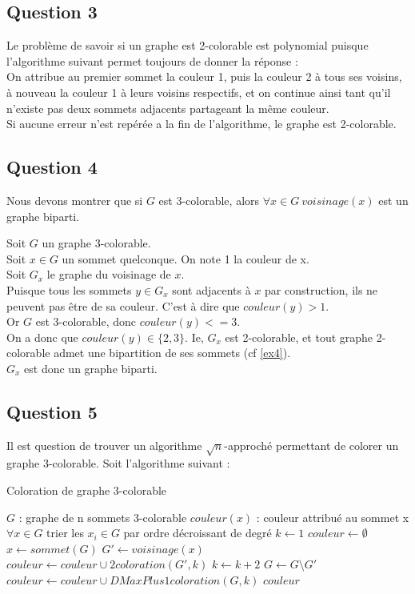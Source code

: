 \subsection{Question 3}\label{ex16_q3}
Le probl\`eme de savoir si un graphe est 2-colorable est polynomial puisque l'algorithme
suivant permet toujours de donner la r\'eponse :\\
On attribue au premier sommet la couleur 1, puis la couleur 2 \`a tous ses voisins, \`a
nouveau la couleur 1 \`a leurs voisins respectifs, et on continue ainsi tant qu'il
n'existe pas deux sommets adjacents partageant la m\^eme couleur.\\
Si aucune erreur n'est rep\'er\'ee a la fin de l'algorithme, le graphe est 2-colorable.

\subsection{Question 4}\label{ex16_q4}
Nous devons montrer que si $G$ est 3-colorable, alors $\forall x \in G\ voisinage(x)$ est
un graphe biparti.

Soit $G$ un graphe 3-colorable.\\
Soit $x \in G$ un sommet quelconque. On note 1 la couleur de x.\\
Soit $G_x$ le graphe du voisinage de $x$.\\
Puisque tous les sommets $y \in G_x$ sont adjacents \`a $x$ par construction, ils ne
peuvent pas \^etre de sa couleur. C'est \`a dire que $couleur(y) > 1$.\\
Or $G$ est 3-colorable, donc $couleur(y) <= 3$.\\
On a donc que $couleur(y) \in \{2,3\}$.
Ie, $G_x$ est 2-colorable, et tout graphe 2-colorable admet une bipartition de ses
sommets (cf \ref{ex4}).\\
$G_x$ est donc un graphe biparti.

\subsection{Question 5}\label{ex16_q5}
Il est question de trouver un algorithme $\sqrt{n}$-approch\'e permettant de colorer un
graphe 3-colorable.
Soit l'algorithme suivant :

\begin{center}
\begin{algorithm}[H]
\caption{Coloration de graphe 3-colorable}\label{ex16_algo1}
\begin{algorithmic}[1]
\REQUIRE $G$ : graphe de n sommets 3-colorable
\ENSURE $couleur(x)$ : couleur attribu\'e au sommet x $\forall x \in G$ 
	\STATE trier les $x_i \in G$ par ordre d\'ecroissant de degr\'e
	\STATE $k \leftarrow 1$
	\STATE $couleur \leftarrow \emptyset$
	\REPEAT
		\STATE $x \leftarrow sommet(G)$
		\STATE $G' \leftarrow voisinage(x)$
		\STATE $couleur \leftarrow couleur \cup 2coloration(G',k)$
		\STATE $k \leftarrow k+2$
		\STATE $G \leftarrow G \setminus G'$
	\STATE $couleur \leftarrow couleur \cup DMaxPlus1coloration(G,k)$
\RETURN $couleur$
\end{algorithmic}
\end{algorithm}
\end{center}


